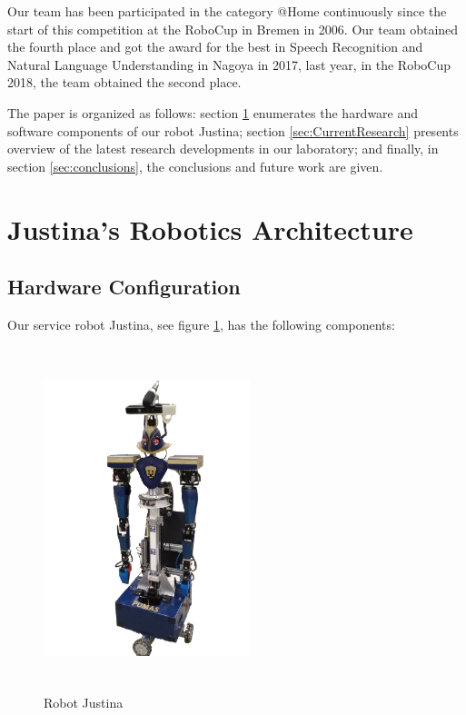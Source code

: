 \documentclass{llncs}
\begin{document}
Our team has been participated in the category @Home continuously since the start of this competition at the RoboCup in Bremen in 2006. Our team obtained the  fourth place and got the award for the best in Speech Recognition and Natural Language Understanding in Nagoya in 2017, last year, in the RoboCup 2018, the team obtained the second place.

The paper is organized as follows:
section \ref{sec:background} enumerates the hardware and software components of our robot
Justina; section \ref{sec:CurrentResearch}  presents overview of the latest research developments in our
laboratory; and finally, in section \ref{sec:conclusions}, the conclusions and future work are given.


\section{Justina's Robotics Architecture}\label{sec:background}
\subsection{Hardware Configuration}

Our service robot Justina, see figure \ref{fig:justina}, has the following components:\\

\begin{figure}
	\includegraphics[angle=0, height=10cm, width=6cm]{Figures/ImagenNuevaJustina.png}
  \caption{Robot Justina}
  \label{fig:justina}
\end{figure}
\end{document}
